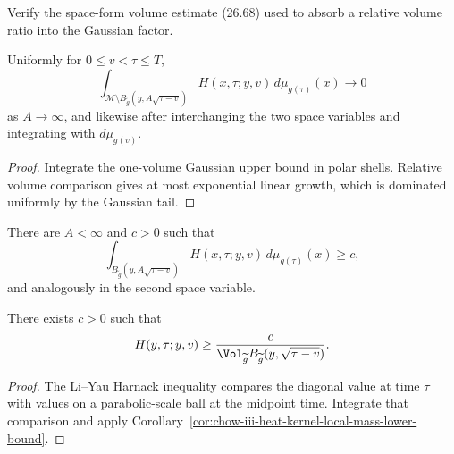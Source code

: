 \begin{claim}
\label{clm:chow-iii-space-form-volume-absorption-exercise}
Verify the space-form volume estimate (26.68) used to absorb a relative
volume ratio into the Gaussian factor.
\end{claim}

\begin{lemma}
\label{lem:chow-iii-heat-kernel-mass-concentration}
Uniformly for \(0\le v<\tau\le T\),
\[
 \int_{\mathcal M\setminus B_{\widetilde g}(y,A\sqrt{\tau-v})}
 H(x,\tau;y,v)\,d\mu_{g(\tau)}(x)\longrightarrow0
\]
as \(A\to\infty\), and likewise after interchanging the two space variables
and integrating with \(d\mu_{g(v)}\).
\end{lemma}
\begin{proof}
\sketch Integrate the one-volume Gaussian upper bound in polar shells.  Relative
volume comparison gives at most exponential linear growth, which is dominated
uniformly by the Gaussian tail.
\end{proof}

\begin{corollary}
\label{cor:chow-iii-heat-kernel-local-mass-lower-bound}
There are \(A<\infty\) and \(c>0\) such that
\[
 \int_{B_{\widetilde g}(y,A\sqrt{\tau-v})}H(x,\tau;y,v)
 \,d\mu_{g(\tau)}(x)\ge c,
\]
and analogously in the second space variable.
\end{corollary}

\begin{lemma}
\label{lem:chow-iii-evolving-heat-kernel-diagonal-lower-bound}
There exists \(c>0\) such that
\[
 H(y,\tau;y,v)\ge
 \frac{c}{\Vol_{\widetilde g}B_{\widetilde g}(y,\sqrt{\tau-v})}.
\]
\end{lemma}
\begin{proof}
\sketch The Li--Yau Harnack inequality compares the diagonal value at time \(\tau\)
with values on a parabolic-scale ball at the midpoint time.  Integrate that
comparison and apply Corollary~\ref{cor:chow-iii-heat-kernel-local-mass-lower-bound}.
\end{proof}

